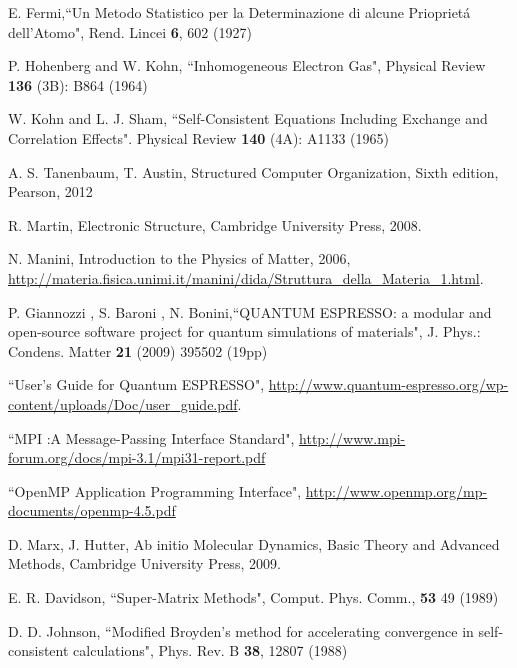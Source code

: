 \documentclass[a4paper,12pt]{article}
\begin{document}
\begin{thebibliography}{9}
E. Fermi,``Un Metodo Statistico per la Determinazione di alcune Priopriet\'a dell'Atomo", Rend. Lincei \textbf{6}, 602 (1927)

P. Hohenberg and W. Kohn, ``Inhomogeneous Electron Gas",  Physical Review \textbf{136} (3B): B864 (1964)

W. Kohn and L. J. Sham, ``Self-Consistent Equations Including Exchange and Correlation Effects". Physical Review \textbf{140} (4A): A1133 (1965)


A. S. Tanenbaum, T. Austin,
Structured Computer Organization,
Sixth edition,
Pearson,
2012


R. Martin, 
Electronic Structure,
Cambridge University Press,
2008.

N. Manini, 
Introduction to the Physics of Matter,
2006,
\url{http://materia.fisica.unimi.it/manini/dida/Struttura_della_Materia_1.html}.


P. Giannozzi , S. Baroni , N. Bonini,``QUANTUM ESPRESSO: a modular and open-source software project for quantum simulations of materials", J. Phys.: Condens. Matter \textbf{21} (2009) 395502 (19pp)

``User's Guide for Quantum ESPRESSO", \url{http://www.quantum-espresso.org/wp-content/uploads/Doc/user_guide.pdf}.

``MPI :A Message-Passing Interface Standard", \url{http://www.mpi-forum.org/docs/mpi-3.1/mpi31-report.pdf}

``OpenMP Application Programming Interface", \url{http://www.openmp.org/mp-documents/openmp-4.5.pdf}


D. Marx, J. Hutter,
Ab initio Molecular Dynamics,
Basic Theory and Advanced Methods,
Cambridge University Press,
2009.

E. R. Davidson, ``Super-Matrix Methods", Comput. Phys. Comm., \textbf{53} 49 (1989)

D. D. Johnson, ``Modified Broyden’s method for accelerating convergence in self-consistent calculations", Phys. Rev. B \textbf{38}, 12807 (1988)

\end{thebibliography}
\end{document}
